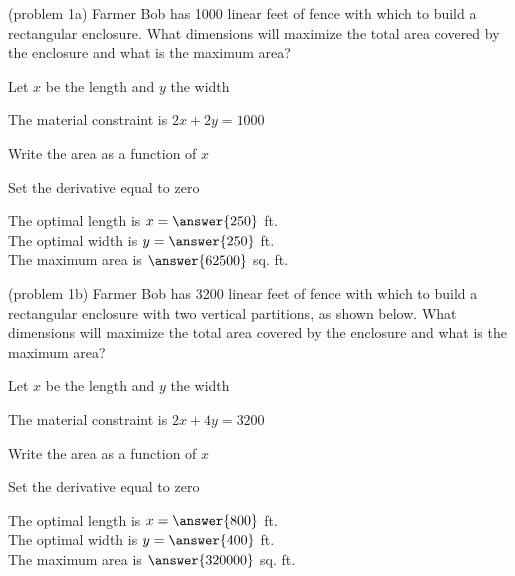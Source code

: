 \documentclass{ximera}
\begin{document}
\begin{problem}(problem 1a)
Farmer Bob has 1000 linear feet of fence with which to build a rectangular enclosure.  What dimensions will maximize the total area covered by the enclosure and what is the maximum area?

\begin{hint}
Let $x$ be the length and $y$ the width
\end{hint}
\begin{hint}
The material constraint is $2x+2y = 1000$
\end{hint}
\begin{hint}
Write the area as a function of $x$
\end{hint}
\begin{hint}
Set the derivative equal to zero
\end{hint}

The optimal length is $x= \answer{250}$ ft.\\
The optimal width is $y = \answer{250}$ ft.\\
The maximum area is $\answer{62500}$ sq. ft.


\end{problem}


\begin{problem}(problem 1b)
Farmer Bob has 3200 linear feet of fence with which to build a rectangular enclosure with two vertical partitions, as shown below.
What dimensions will maximize the total area covered by the enclosure and what is the maximum area?

\begin{center}
\end{center}
\begin{hint}
Let $x$ be the length and $y$ the width
\end{hint}
\begin{hint}
The material constraint is $2x+4y = 3200$
\end{hint}
\begin{hint}
Write the area as a function of $x$
\end{hint}
\begin{hint}
Set the derivative equal to zero
\end{hint}

The optimal length is $x= \answer{800}$ ft.\\
The optimal width is $y = \answer{400}$ ft.\\
The maximum area is $\answer{320000}$ sq. ft.
 
\end{problem}
\end{document}

